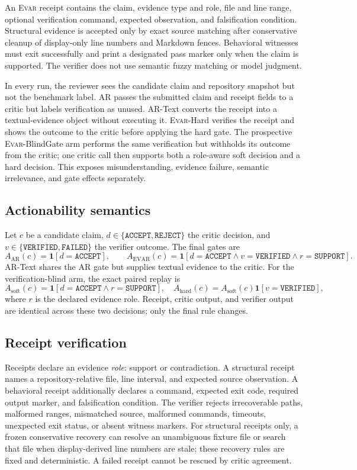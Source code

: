 \documentclass[acmsmall,screen,review,anonymous]{acmart}
\newcommand{\evar}{\textsc{Evar}\xspace}
\begin{document}
An \evar receipt contains the claim, evidence type and role, file and line range, optional verification command, expected observation, and falsification condition. Structural evidence is accepted only by exact source matching after conservative cleanup of display-only line numbers and Markdown fences. Behavioral witnesses must exit successfully and print a designated pass marker only when the claim is supported. The verifier does not use semantic fuzzy matching or model judgment.

In every run, the reviewer sees the candidate claim and repository snapshot but not the benchmark label. AR passes the submitted claim and receipt fields to a critic but labels verification as unused. AR-Text converts the receipt into a textual-evidence object without executing it. \evar-Hard verifies the receipt and shows the outcome to the critic before applying the hard gate. The prospective \evar-BlindGate arm performs the same verification but withholds its outcome from the critic; one critic call then supports both a role-aware soft decision and a hard decision. This exposes misunderstanding, evidence failure, semantic irrelevance, and gate effects separately.

\subsection{Actionability semantics}

Let $c$ be a candidate claim, $d\in\{\texttt{ACCEPT},\texttt{REJECT}\}$ the critic decision, and $v\in\{\texttt{VERIFIED},\texttt{FAILED}\}$ the verifier outcome. The final gates are
\[
A_{\mathrm{AR}}(c)=\mathbf{1}[d=\texttt{ACCEPT}],\qquad
A_{\mathrm{EVAR}}(c)=\mathbf{1}[d=\texttt{ACCEPT}\land v=\texttt{VERIFIED}
\land r=\texttt{SUPPORT}].
\]
AR-Text shares the AR gate but supplies textual evidence to the critic. For the
verification-blind arm, the exact paired replay is
\[
A_{\mathrm{soft}}(c)=\mathbf{1}[d=\texttt{ACCEPT}\land r=\texttt{SUPPORT}],\quad
A_{\mathrm{hard}}(c)=A_{\mathrm{soft}}(c)\mathbf{1}[v=\texttt{VERIFIED}],
\]
where $r$ is the declared evidence role. Receipt, critic output, and verifier output are
identical across these two decisions; only the final rule changes.

\subsection{Receipt verification}

Receipts declare an evidence \emph{role}: support or contradiction. A structural receipt names a repository-relative file, line interval, and expected source observation. A behavioral receipt additionally declares a command, expected exit code, required output marker, and falsification condition. The verifier rejects irrecoverable paths, malformed ranges, mismatched source, malformed commands, timeouts, unexpected exit status, or absent witness markers. For structural receipts only, a frozen conservative recovery can resolve an unambiguous fixture file or search that file when display-derived line numbers are stale; these recovery rules are fixed and deterministic. A failed receipt cannot be rescued by critic agreement.
\end{document}
